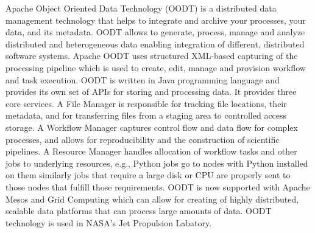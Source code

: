 \begin{enumerate}
Apache Object Oriented Data Technology (OODT) \label{\detokenize{i524/technologies:id711}}{\hyperref[\detokenize{i524/technologies:www-oodt}]{\sphinxcrossref{{[}621{]}}}} is
a distributed data management technology that helps to integrate
and archive your processes, your data, and its metadata. OODT
allows to generate, process, manage and analyze distributed and
heterogeneous data enabling integration of different, distributed
software systems. Apache OODT uses structured XML-based capturing
of the processing pipeline which is used to create, edit, manage
and provision workflow and task execution. OODT is written in
Java programming language and provides its own set of APIs for
storing and processing data. \label{\detokenize{i524/technologies:id712}}{\hyperref[\detokenize{i524/technologies:www-oodt-documentation}]{\sphinxcrossref{{[}622{]}}}} It
provides three core services. A File Manager is responsible for
tracking file locations, their metadata, and for transferring
files from a staging area to controlled access storage. A
Workflow Manager captures control flow and data flow for complex
processes, and allows for reproducibility and the construction of
scientific pipelines. A Resource Manager handles allocation of
workflow tasks and other jobs to underlying resources, e.g.,
Python jobs go to nodes with Python installed on them similarly
jobs that require a large disk or CPU are properly sent to those
nodes that fulfill those requirements. OODT is now supported with
Apache Mesos and Grid Computing which can allow for creating of
highly distributed, scalable data platforms that can process
large amounts of data. OODT technology is used in NASA's Jet
Propulsion Labatory.

\end{enumerate}
